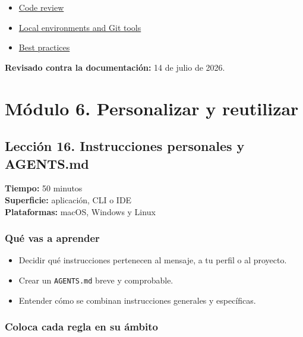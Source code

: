 \documentclass[10pt,a4paper,openany]{book}
\providecommand{\tightlist}{\setlength{\itemsep}{0.18em}\setlength{\parskip}{0pt}}
\begin{document}
\begin{itemize}
\tightlist
\item
  \href{https://learn.chatgpt.com/docs/code-review?surface=app}{Code
  review}
\item
  \href{https://learn.chatgpt.com/docs/environments/local-environment}{Local
  environments and Git tools}
\item
  \href{https://learn.chatgpt.com/guides/best-practices}{Best practices}
\end{itemize}

\textbf{Revisado contra la documentación:} 14 de julio de 2026.

\chapter{Módulo 6. Personalizar y
reutilizar}\label{muxf3dulo-6.-personalizar-y-reutilizar}

\clearpage

\section{Lección 16. Instrucciones personales y
AGENTS.md}\label{lecciuxf3n-16.-instrucciones-personales-y-agents.md}

\begin{metabox}

\textbf{Tiempo:} 50 minutos\\
\textbf{Superficie:} aplicación, CLI o IDE\\
\textbf{Plataformas:} macOS, Windows y Linux

\end{metabox}

\subsection{Qué vas a aprender}\label{quuxe9-vas-a-aprender-15}

\begin{itemize}
\tightlist
\item
  Decidir qué instrucciones pertenecen al mensaje, a tu perfil o al
  proyecto.
\item
  Crear un \texttt{AGENTS.md} breve y comprobable.
\item
  Entender cómo se combinan instrucciones generales y específicas.
\end{itemize}

\subsection{Coloca cada regla en su
ámbito}\label{coloca-cada-regla-en-su-uxe1mbito}
\end{document}
